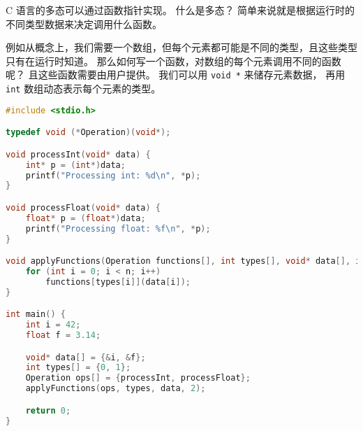 

C 语言的多态可以通过函数指针实现。 什么是多态？ 简单来说就是根据运行时的不同类型数据来决定调用什么函数。

例如从概念上，我们需要一个数组，但每个元素都可能是不同的类型，且这些类型只有在运行时知道。 那么如何写一个函数，对数组的每个元素调用不同的函数呢？ 且这些函数需要由用户提供。 我们可以用 \verb`void *` 来储存元素数据， 再用 \verb`int` 数组动态表示每个元素的类型。

\begin{lstlisting}[language=cpp]
#include <stdio.h>

typedef void (*Operation)(void*);

void processInt(void* data) {
    int* p = (int*)data;
    printf("Processing int: %d\n", *p);
}

void processFloat(void* data) {
    float* p = (float*)data;
    printf("Processing float: %f\n", *p);
}

void applyFunctions(Operation functions[], int types[], void* data[], int n) {
    for (int i = 0; i < n; i++)
        functions[types[i]](data[i]);
}

int main() {
    int i = 42;
    float f = 3.14;

    void* data[] = {&i, &f};
    int types[] = {0, 1};
    Operation ops[] = {processInt, processFloat};
    applyFunctions(ops, types, data, 2);

    return 0;
}
\end{lstlisting}
